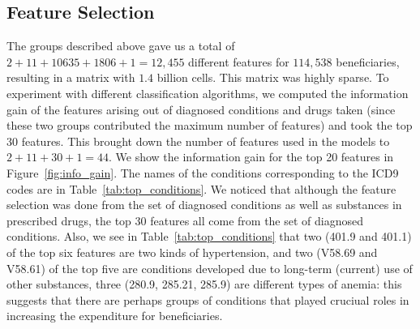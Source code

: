 \subsection{Feature Selection}
\label{subsec:featuresel}
The groups described above gave us a total of $2 + 11 + 10635 + 1806 + 1 = 12,455$ different features for $114,538$ beneficiaries, resulting in a matrix with $1.4$ billion cells. This matrix was highly sparse. To experiment with different classification algorithms, we computed the information gain \cite{Bishop06} of the features arising out of diagnosed conditions and drugs taken (since these two groups contributed the maximum number of features) and took the top 30 features. This brought down the number of features used in the models to $2 + 11 + 30 + 1 = 44$. We show the information gain for the top 20 features in Figure~\ref{fig:info_gain}. The names of the conditions corresponding to the ICD9 codes are in Table~\ref{tab:top_conditions}. We noticed that although the feature selection was done from the set of diagnosed conditions as well as substances in prescribed drugs, the top 30 features all come from the set of diagnosed conditions. Also, we see in Table~\ref{tab:top_conditions} that two (401.9 and 401.1) of the top six features are two kinds of hypertension, and two (V58.69 and V58.61) of the top five are conditions developed due to long-term (current) use of other substances, three (280.9, 285.21, 285.9) are different types of anemia: this suggests that there are perhaps groups of conditions that played cruciual roles in increasing the expenditure for beneficiaries.


